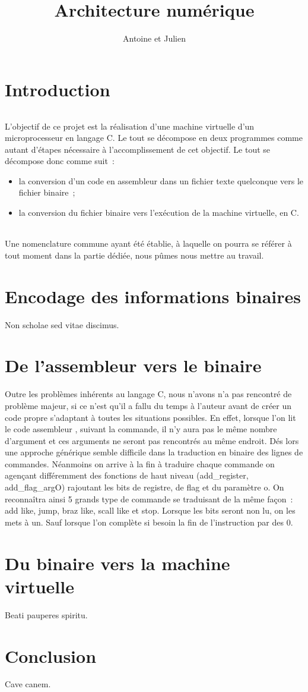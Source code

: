 \documentclass[11pt]{article}
\begin{document}
	\title{Architecture numérique}
	\author{Antoine  et Julien }
	\maketitle

	\part*{Introduction}
	\paragraph{}
	L'objectif de ce projet est la réalisation d'une machine virtuelle d'un microprocesseur en langage C. Le tout se décompose en deux programmes comme autant d'étapes nécessaire à l'accomplissement de cet objectif. Le tout se décompose donc comme suit~:

	\begin{itemize}
		\item la conversion d'un code en assembleur dans un fichier texte quelconque vers le fichier binaire~;
		\item la conversion du fichier binaire vers l'exécution de la machine virtuelle, en C.
	\end{itemize}

	\paragraph{}
	Une nomenclature commune ayant été établie, à laquelle on pourra se référer à tout moment dans la partie dédiée, nous pûmes nous mettre au travail.

	\part*{Encodage des informations binaires}
	Non scholae sed vitae discimus.

	\part*{De l'assembleur vers le binaire}
	Outre les problèmes inhérents au langage C, nous n'avons n'a pas rencontré de problème majeur, si ce n'est qu'il a fallu du temps à l'auteur avant de créer un code propre s'adaptant à toutes les situations possibles. 
En effet, lorsque l'on lit le code assembleur , suivant la commande, il n'y aura pas le même nombre d'argument et ces arguments ne seront pas rencontrés au même endroit. Dés lors une approche générique semble difficile dans la traduction en binaire des lignes de commandes. Néanmoins on arrive à la fin à traduire chaque commande on agençant différemment des fonctions de haut niveau (add_register, add_flag_argO) rajoutant les bits de registre, de flag et du paramètre o. On reconnaîtra ainsi 5 grands type de commande se traduisant de la même façon : add like, jump, braz like, scall like et stop.
Lorsque les bits seront non lu, on les mets à un. Sauf lorsque l'on complète si besoin la fin de l'instruction par des 0.

	\part*{Du binaire vers la machine virtuelle}
	Beati pauperes spiritu.

	\part*{Conclusion}
	Cave canem.
\end{document}
